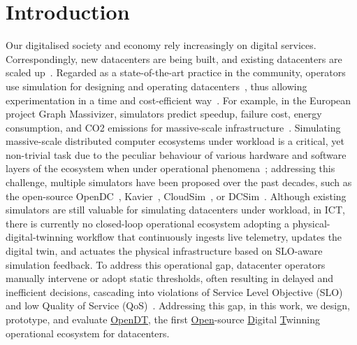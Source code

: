 \section{Introduction} \label{sec:introduction}

Our digitalised society and economy rely increasingly on digital services. Correspondingly, new datacenters are being built, and existing datacenters are scaled up~\cite{DBLP:journals/corr/abs-2206-03259, nicolae5377101m3sa, DBLP:conf/sc/AndreadisVMI18, market:IDC24AI}. Regarded as a state-of-the-art practice in the community, operators use simulation for designing and operating datacenters~\cite{DBLP:journals/corr/abs-2206-03259, nicolae5377101m3sa, DBLP:conf/ccgrid/MastenbroekAJLB21}, thus allowing experimentation in a time and cost-efficient way~\cite{Iosup2024DigitalTwins, DBLP:conf/ccgrid/MastenbroekAJLB21}. For example, in the European project Graph Massivizer, simulators predict speedup, failure cost, energy consumption, and CO2 emissions for massive-scale infrastructure~\cite{nicolae5377101m3sa, DBLP:conf/compsac/MolanKBTPCIRRVP23, DBLP:conf/wosp/IosupPVTMHZBFK23, DBLP:conf/wosp/Sanchez0RP23}. Simulating massive-scale distributed computer ecosystems under workload is a critical, yet non-trivial task due to the peculiar behaviour of various hardware and software layers of the ecosystem when under operational phenomena~\cite{DBLP:conf/wosp/ChuTVI23, DBLP:conf/ccgrid/KondoJIE10}; addressing this challenge, multiple simulators have been proposed over the past decades, such as the open-source OpenDC~\cite{DBLP:conf/ccgrid/MastenbroekAJLB21}, Kavier~\cite{Nicolae2025BSc}, CloudSim~\cite{DBLP:journals/spe/CalheirosRBRB11}, or DCSim~\cite{DBLP:conf/cnsm/TigheKBL12}. 
Although existing simulators are still valuable for simulating datacenters under workload, in ICT, there is currently no closed-loop operational ecosystem adopting a physical-digital-twinning workflow that continuously ingests live telemetry, updates the digital twin, and actuates the physical infrastructure based on SLO-aware simulation feedback. To address this operational gap, datacenter operators manually intervene or adopt static thresholds, often resulting in delayed and inefficient decisions, cascading into violations of Service Level Objective (SLO) and low Quality of Service (QoS)~. Addressing this gap, in this work, we design, prototype, and evaluate \underline{OpenDT}, the first \underline{Open}-source \underline{D}igital \underline{T}winning operational ecosystem for datacenters.

